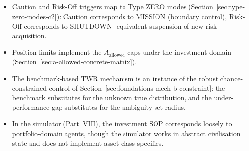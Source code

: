 \begin{itemize}
\item Caution and Risk-Off triggers map to Type ZERO modes
(Section~\ref{sec:type-zero-modes-c2}): Caution corresponds to
MISSION (boundary control), Risk-Off corresponds to SHUTDOWN-
equivalent suspension of new risk acquisition.
\item Position limits implement the $A_{\mathrm{allowed}}$ caps under
the investment domain
(Section~\ref{sec:a-allowed-concrete-matrix}).
\item The benchmark-based TWR mechanism is an instance of the robust
chance-constrained control of
Section~\ref{sec:foundations-mech-b-constraint}: the benchmark
substitutes for the unknown true distribution, and the
under-performance gap substitutes for the ambiguity-set radius.
\item In the simulator (Part~VIII), the investment SOP corresponds
loosely to portfolio-domain agents, though the simulator works in
abstract civilisation state and does not implement asset-class
specifics.
\end{itemize}
